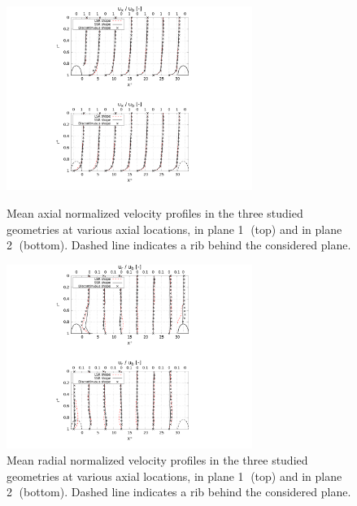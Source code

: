\begin{figure}[p]

\begin{minipage}[c][11.5cm][t]{1.0\linewidth}
\centering
\includegraphics[width=8cm]{fig/applications/optim/Axial_vel_compare.pdf}
\caption{Mean axial normalized velocity profiles in the three studied geometries at various axial locations, in plane \textcircled{1} (top) and in plane \textcircled{2} (bottom). Dashed line indicates a rib behind the considered plane.}
\label{axial_vel_compare}
\end{minipage}

\begin{minipage}[c][11.5cm][b]{1.0\linewidth}
\centering
\includegraphics[width=8cm]{fig/applications/optim/Radial_vel_compare.pdf}
\caption{Mean radial normalized velocity profiles in the three studied geometries at various axial locations, in plane \textcircled{1} (top) and in plane \textcircled{2} (bottom). Dashed line indicates a rib behind the considered plane.}
\label{radial_vel_compare}
\end{minipage}

\end{figure}

